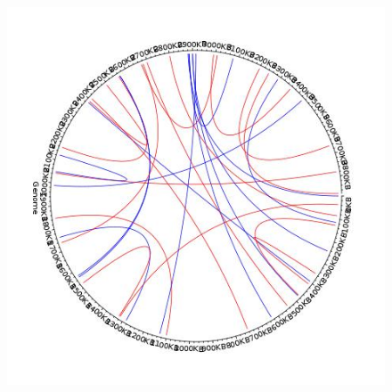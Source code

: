 \begin{figure}[h!]
\centering
\includegraphics[width=\textwidth{}]{Chapter_2/UK54_new_basketball.jpeg}
\caption{  }
\label{fig:UK54_new_basket}
\end{figure}

